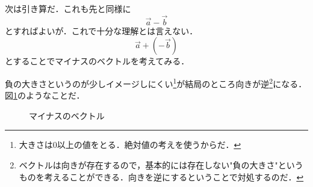     次は引き算だ．これも先と同様に
    \[
    \vec{a}-\vec{b}
    \]
    とすればよいが．これで十分な理解とは言えない．
    \[
    \vec{a}+ (-\vec{b})
    \]
    とすることでマイナスのベクトルを考えてみる．

    負の大きさというのが少しイメージしにくい\footnote{大きさは0以上の値をとる．絶対値の考えを使うからだ．}が結局のところ向きが逆\footnote{ベクトルは向きが存在するので，基本的には存在しない"負の大きさ"というものを考えることができる．向きを逆にするということで対処するのだ．}になる．図\ref{fig:vector_mainasu}のようなことだ．
    \begin{figure}[htbp]
        \begin{center}
        \end{center}
        \caption{マイナスのベクトル}
        \label{fig:vector_mainasu}
    \end{figure}

